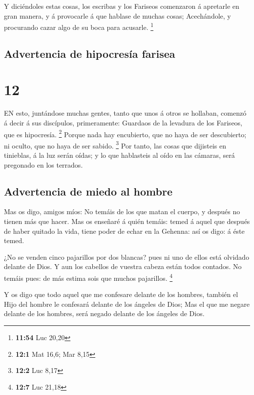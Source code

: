  Y diciéndoles estas cosas, los escribas y los Fariseos
comenzaron á apretarle en gran manera, y á provocarle á que hablase de
muchas cosas;  Acechándole, y procurando cazar algo de su
boca para acusarle. \footnote{\textbf{11:54} Luc 20,20}

\hypertarget{advertencia-de-hipocresuxeda-farisea}{%
\subsection{Advertencia de hipocresía
farisea}\label{advertencia-de-hipocresuxeda-farisea}}

\hypertarget{section-11}{%
\section{12}\label{section-11}}

 EN esto, juntándose muchas gentes, tanto que unos á otros
se hollaban, comenzó á decir á sus discípulos, primeramente: Guardaos de
la levadura de los Fariseos, que es hipocresía. \footnote{\textbf{12:1}
  Mat 16,6; Mar 8,15}  Porque nada hay encubierto, que no
haya de ser descubierto; ni oculto, que no haya de ser sabido.
\footnote{\textbf{12:2} Luc 8,17}  Por tanto, las cosas que
dijisteis en tinieblas, á la luz serán oídas; y lo que hablasteis al
oído en las cámaras, será pregonado en los terrados.

\hypertarget{advertencia-de-miedo-al-hombre}{%
\subsection{Advertencia de miedo al
hombre}\label{advertencia-de-miedo-al-hombre}}

 Mas os digo, amigos míos: No temáis de los que matan el
cuerpo, y después no tienen más que hacer.  Mas os enseñaré
á quién temáis: temed á aquel que después de haber quitado la vida,
tiene poder de echar en la Gehenna: así os digo: á éste temed.

 ¿No se venden cinco pajarillos por dos blancas? pues ni uno
de ellos está olvidado delante de Dios.  Y aun los cabellos
de vuestra cabeza están todos contados. No temáis pues: de más estima
sois que muchos pajarillos. \footnote{\textbf{12:7} Luc 21,18}

 Y os digo que todo aquel que me confesare delante de los
hombres, también el Hijo del hombre le confesará delante de los ángeles
de Dios;  Mas el que me negare delante de los hombres, será
negado delante de los ángeles de Dios.

